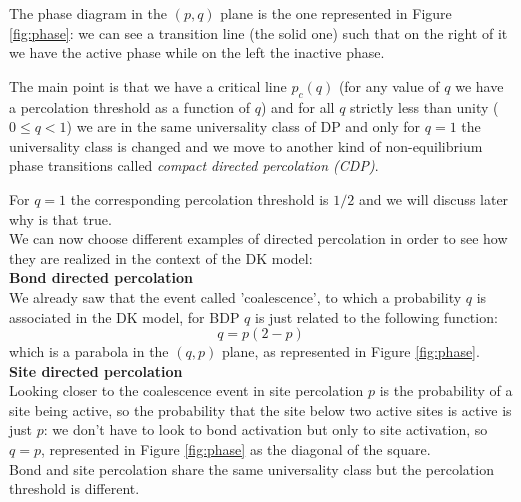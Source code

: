 \documentclass[\main/main.tex]{subfiles}
\begin{document}
The phase diagram in the $(p,q)$ plane is the one represented in Figure \ref{fig:phase}: we can see a transition line (the solid one) such that on the right of it we have the active phase while on the left the inactive phase.

The main point is that we have a critical line $p_c(q)$ (for any value of $q$ we have a percolation threshold as a function of $q$) and for all $q$ strictly less than unity ($0\leq q <1$) we are in the same universality class of DP and only for $q=1$ the universality class is changed and we move to another kind of non-equilibrium phase transitions called \textit{compact directed percolation (CDP)}.

For $q=1$ the corresponding percolation threshold is $1/2$ and we will discuss later why is that true. \\

We can now choose different examples of directed percolation in order to see how they are realized in the context of the DK model:\\

\textbf{Bond directed percolation} \\
We already saw that the event called 'coalescence', to which a  probability $q$ is associated in the DK model, for BDP $q$ is just related to the following function:
\begin{equation}
    q=p(2-p)
\end{equation}
which is a parabola in the $(q,p)$ plane, as represented in Figure \ref{fig:phase}. \\

\textbf{Site directed percolation} \\
Looking closer to the coalescence event in site percolation $p$ is the probability of a site being active, so the probability that the site below two active sites is active is just $p$: we don't have to look to bond activation but only to site activation, so $q=p$, represented in Figure \ref{fig:phase} as the diagonal of the square. \\

Bond and site percolation share the same universality class but the percolation threshold is different.
\end{document}
